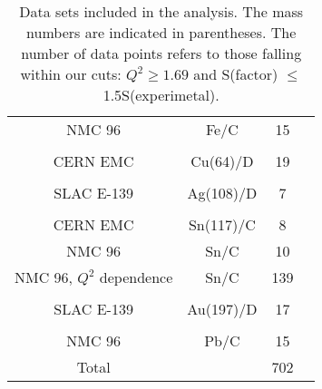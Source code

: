 \begin{table}
\begin{tabular}{c c c c}
  NMC 96 & Fe/C & 15 & \cite{Arneodo:1996rv}\\
\\
  CERN EMC & Cu(64)/D & 19 & \cite{Ashman:1992kv}\\
\\
  SLAC E-139 & Ag(108)/D & 7 & \cite{PhysRevD.49.4348}\\
\\
 CERN EMC & Sn(117)/C & 8 & \cite{Ashman:1992kv}\\
 NMC 96 & Sn/C & 10 & \cite{Arneodo:1996rv}\\
 NMC 96, $Q^2$ dependence  & Sn/C & 139 & \cite{Arneodo:1996ru}\\
\\
  SLAC E-139 & Au(197)/D & 17 & \cite{PhysRevD.49.4348}\\
\\
 NMC 96 & Pb/C & 15 & \cite{Arneodo:1996rv}\\
\hline
 Total & & 702 & \\
\hline
\hline
\end{tabular}
\caption{Data sets included in the analysis. The mass numbers are indicated in parentheses. The number of data points refers to those falling within our cuts: $Q^2 \ge 1.69$ and S(factor) $\le $ 1.5S(experimetal).}
\label{dataset}
\end{table}

